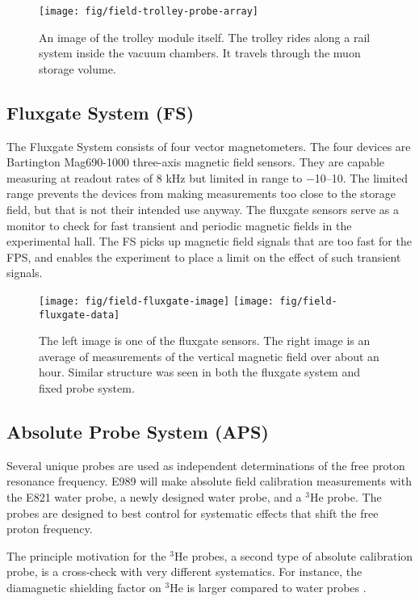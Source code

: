\begin{figure}
\label{fig:field-trolley-probe-array}
\centering
\texttt{[image: fig/field-trolley-probe-array]}
\caption{An image of the trolley module itself.  The trolley rides along a rail system inside the vacuum chambers.  It travels through the muon storage volume.}
\end{figure}

\subsection{Fluxgate System (FS)}

The Fluxgate System consists of four vector magnetometers.  The four devices are Bartington Mag690-1000 three-axis magnetic field sensors.  They are capable measuring at readout rates of 8 kHz but limited in range to \SIrange{-10}{+10}{\gauss}.  The limited range prevents the devices from making measurements too close to the storage field, but that is not their intended use anyway.  The fluxgate sensors serve as a monitor to check for fast transient and periodic magnetic fields in the experimental hall.  The FS picks up magnetic field signals that are too fast for the FPS, and enables the experiment to place a limit on the effect of such transient signals.

\begin{figure}
\label{fig:field-fluxgates}
\texttt{[image: fig/field-fluxgate-image]}
\texttt{[image: fig/field-fluxgate-data]}
\caption{The left image is one of the fluxgate sensors.  The right image is an average of measurements of the vertical magnetic field over about an hour.  Similar structure was seen in both the fluxgate system and fixed probe system.}
\end{figure}

\subsection{Absolute Probe System (APS)}

Several unique probes are used as independent determinations of the free proton resonance frequency.  E989 will make absolute field calibration measurements with the E821 water probe, a newly designed water probe, and a $\mathrm{^3He}$ probe. The probes are designed to best control for systematic effects that shift the free proton frequency.

The principle motivation for the $\mathrm{^3He}$ probes, a second type of absolute calibration probe, is a cross-check with very different systematics.  For instance, the diamagnetic shielding factor on $\mathrm{^3He}$ is larger compared to water probes \cite{e989-tdr}.

